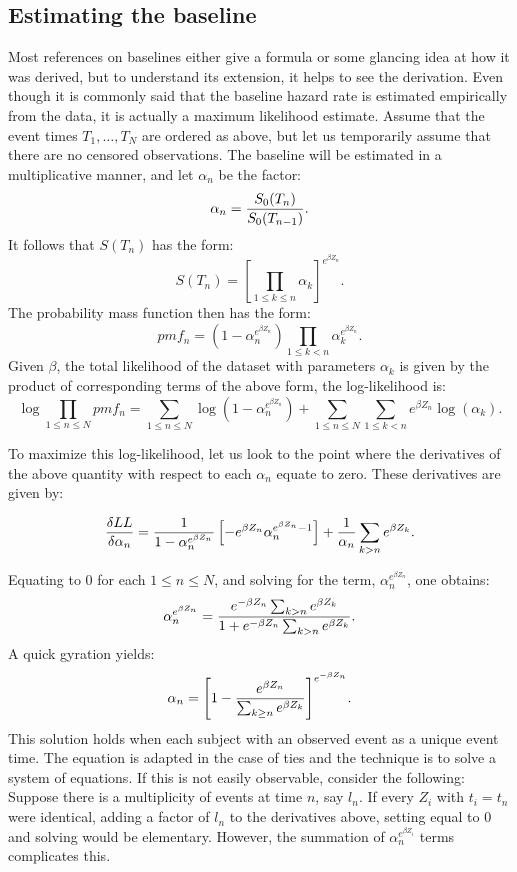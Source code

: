 \documentclass[10pt]{article}
\begin{document}
\subsection{Estimating the baseline}

Most references on baselines either give a formula or some glancing idea at how it was derived, but to understand its extension, it helps to see the 
derivation. Even though it is commonly said that the baseline hazard rate is estimated empirically from the data, it is actually 
a maximum likelihood estimate.
Assume that the event times $T_1, \ldots, T_N$ are ordered as above, 
but let us temporarily assume that there are no censored observations.  The baseline will be 
estimated in a multiplicative manner, and let $\alpha_n$ be the factor:
	$$\alpha_n={S_0(T_n)\over S_0(T_{n-1})}.$$
It follows that $S(T_n)$ has the form:
	$$S(T_n)={\left[{\prod_{1 \le k \le n} \alpha_k }\right]}^{e^{\beta Z_n}}.$$
The probability mass function then has the form:
	$$pmf_n=(1-\alpha_n^{e^{\beta Z_n}})\prod_{1 \le k < n} \alpha_k^{e^{\beta Z_n}}.$$
Given $\beta$, the total likelihood of the dataset with parameters $\alpha_k$ is given by the product of corresponding terms of the above form, the log-likelihood is:
	$$\log{\prod_{1 \le n \le N} pmf_n}=\sum_{1 \le n \le N} \log(1-\alpha_n^{e^{\beta Z_n}}) +
	\sum_{1 \le n \le N}\sum_{1 \le k < n} e^{\beta Z_n}\log( \alpha_k ).$$

To maximize this log-likelihood, let us look to the point where the derivatives of the above quantity with respect to each $\alpha_n$ equate to zero.  
These derivatives are given by:

$${\delta LL \over \delta \alpha_n}= {1\over 1-\alpha_n^{e^{\beta Z_n}}}\left[{-e^{\beta Z_n}\alpha_n^{e^{\beta Z_n}-1}}\right] +{1\over \alpha_n}
\sum_{k > n} e^{\beta Z_k}.$$

Equating to 0 for each $1 \le n \le N$, and solving for the term, $\alpha_n^{e^{\beta Z_n}}$, one obtains:
$$\alpha_n^{e^{\beta Z_n}}={e^{-\beta Z_n}\sum_{k > n} e^{\beta Z_k} \over 1+ e^{-\beta Z_n}\sum_{k > n} e^{\beta Z_k}}.$$
A quick gyration yields:
$$\alpha_n={\left[{1-{e^{\beta Z_n}\over \sum_{ k \ge n} e^{\beta Z_k}}}\right]}^{e^{-\beta Z_n}}.$$
This solution holds when each subject with an observed event as a unique event time. The equation is adapted in the case of ties and the technique is to 
solve a system of equations.  If this is not easily observable, consider the following:  Suppose there is a multiplicity of events at time $n$, say $l_n$. 
If every $Z_i$ with $t_i=t_n$ were identical, adding a factor of $l_n$ to the derivatives above, setting equal to 0 and solving would be elementary.  
However, the summation of $\alpha_n^{e^{\beta Z_i}}$ terms complicates this.  
\end{document}
